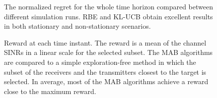 \documentclass[english, 12pt, a4paper, elec, utf8, a-1b, online]{aaltothesis}
\begin{document}
\begin{figure}[!tb]\centering
    \hfill
    \caption{The normalized regret for the whole time horizon compared between different simulation runs.
            RBE and KL-UCB obtain excellent results in both stationary and non-stationary scenarios.}
    \label{fig:ci}
\end{figure}

\begin{figure}[!tb]
    \hfill
    \caption{Reward at each time instant.
    The reward is a mean of the channel SINRs in a linear scale for the selected subset.
    The MAB algorithms are compared to a simple exploration-free method in which the subset of the receivers and the transmitters closest to the target is selected.
    In average, most of the MAB algorithms achieve a reward close to the maximum reward.}
    \label{fig:sinr}
\end{figure}
\end{document}

